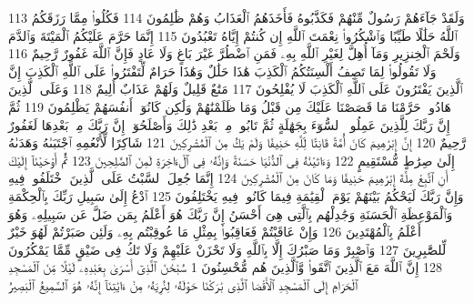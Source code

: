 {\tiny\colorbox{cl_aya}{113}} وَلَقَدْ جَآءَهُمْ رَسُولٌ مِّنْهُمْ فَكَذَّبُوهُ فَأَخَذَهُمُ ٱلْعَذَابُ وَهُمْ ظَٰلِمُونَ
{\tiny\colorbox{cl_aya}{114}} فَكُلُوا۟ مِمَّا رَزَقَكُمُ ٱللَّهُ حَلَٰلًا طَيِّبًا وَٱشْكُرُوا۟ نِعْمَتَ ٱللَّهِ إِن كُنتُمْ إِيَّاهُ تَعْبُدُونَ
{\tiny\colorbox{cl_aya}{115}} إِنَّمَا حَرَّمَ عَلَيْكُمُ ٱلْمَيْتَةَ وَٱلدَّمَ وَلَحْمَ ٱلْخِنزِيرِ وَمَآ أُهِلَّ لِغَيْرِ ٱللَّهِ بِهِۦ فَمَنِ ٱضْطُرَّ غَيْرَ بَاغٍ وَلَا عَادٍ فَإِنَّ ٱللَّهَ غَفُورٌ رَّحِيمٌ
{\tiny\colorbox{cl_aya}{116}} وَلَا تَقُولُوا۟ لِمَا تَصِفُ أَلْسِنَتُكُمُ ٱلْكَذِبَ هَٰذَا حَلَٰلٌ وَهَٰذَا حَرَامٌ لِّتَفْتَرُوا۟ عَلَى ٱللَّهِ ٱلْكَذِبَ إِنَّ ٱلَّذِينَ يَفْتَرُونَ عَلَى ٱللَّهِ ٱلْكَذِبَ لَا يُفْلِحُونَ
{\tiny\colorbox{cl_aya}{117}} مَتَٰعٌ قَلِيلٌ وَلَهُمْ عَذَابٌ أَلِيمٌ
{\tiny\colorbox{cl_aya}{118}} وَعَلَى ٱلَّذِينَ هَادُوا۟ حَرَّمْنَا مَا قَصَصْنَا عَلَيْكَ مِن قَبْلُ وَمَا ظَلَمْنَٰهُمْ وَلَٰكِن كَانُوٓا۟ أَنفُسَهُمْ يَظْلِمُونَ
{\tiny\colorbox{cl_aya}{119}} ثُمَّ إِنَّ رَبَّكَ لِلَّذِينَ عَمِلُوا۟ ٱلسُّوٓءَ بِجَهَٰلَةٍ ثُمَّ تَابُوا۟ مِنۢ بَعْدِ ذَٰلِكَ وَأَصْلَحُوٓا۟ إِنَّ رَبَّكَ مِنۢ بَعْدِهَا لَغَفُورٌ رَّحِيمٌ
{\tiny\colorbox{cl_aya}{120}} إِنَّ إِبْرَٰهِيمَ كَانَ أُمَّةً قَانِتًا لِّلَّهِ حَنِيفًا وَلَمْ يَكُ مِنَ ٱلْمُشْرِكِينَ
{\tiny\colorbox{cl_aya}{121}} شَاكِرًا لِّأَنْعُمِهِ ٱجْتَبَىٰهُ وَهَدَىٰهُ إِلَىٰ صِرَٰطٍ مُّسْتَقِيمٍ
{\tiny\colorbox{cl_aya}{122}} وَءَاتَيْنَٰهُ فِى ٱلدُّنْيَا حَسَنَةً وَإِنَّهُۥ فِى ٱلْءَاخِرَةِ لَمِنَ ٱلصَّٰلِحِينَ
{\tiny\colorbox{cl_aya}{123}} ثُمَّ أَوْحَيْنَآ إِلَيْكَ أَنِ ٱتَّبِعْ مِلَّةَ إِبْرَٰهِيمَ حَنِيفًا وَمَا كَانَ مِنَ ٱلْمُشْرِكِينَ
{\tiny\colorbox{cl_aya}{124}} إِنَّمَا جُعِلَ ٱلسَّبْتُ عَلَى ٱلَّذِينَ ٱخْتَلَفُوا۟ فِيهِ وَإِنَّ رَبَّكَ لَيَحْكُمُ بَيْنَهُمْ يَوْمَ ٱلْقِيَٰمَةِ فِيمَا كَانُوا۟ فِيهِ يَخْتَلِفُونَ
{\tiny\colorbox{cl_aya}{125}} ٱدْعُ إِلَىٰ سَبِيلِ رَبِّكَ بِٱلْحِكْمَةِ وَٱلْمَوْعِظَةِ ٱلْحَسَنَةِ وَجَٰدِلْهُم بِٱلَّتِى هِىَ أَحْسَنُ إِنَّ رَبَّكَ هُوَ أَعْلَمُ بِمَن ضَلَّ عَن سَبِيلِهِۦ وَهُوَ أَعْلَمُ بِٱلْمُهْتَدِينَ
{\tiny\colorbox{cl_aya}{126}} وَإِنْ عَاقَبْتُمْ فَعَاقِبُوا۟ بِمِثْلِ مَا عُوقِبْتُم بِهِۦ وَلَئِن صَبَرْتُمْ لَهُوَ خَيْرٌ لِّلصَّٰبِرِينَ
{\tiny\colorbox{cl_aya}{127}} وَٱصْبِرْ وَمَا صَبْرُكَ إِلَّا بِٱللَّهِ وَلَا تَحْزَنْ عَلَيْهِمْ وَلَا تَكُ فِى ضَيْقٍ مِّمَّا يَمْكُرُونَ
{\tiny\colorbox{cl_aya}{128}} إِنَّ ٱللَّهَ مَعَ ٱلَّذِينَ ٱتَّقَوا۟ وَّٱلَّذِينَ هُم مُّحْسِنُونَ
{\tiny\colorbox{cl_aya}{1}} سُبْحَٰنَ ٱلَّذِىٓ أَسْرَىٰ بِعَبْدِهِۦ لَيْلًا مِّنَ ٱلْمَسْجِدِ ٱلْحَرَامِ إِلَى ٱلْمَسْجِدِ ٱلْأَقْصَا ٱلَّذِى بَٰرَكْنَا حَوْلَهُۥ لِنُرِيَهُۥ مِنْ ءَايَٰتِنَآ إِنَّهُۥ هُوَ ٱلسَّمِيعُ ٱلْبَصِيرُ
